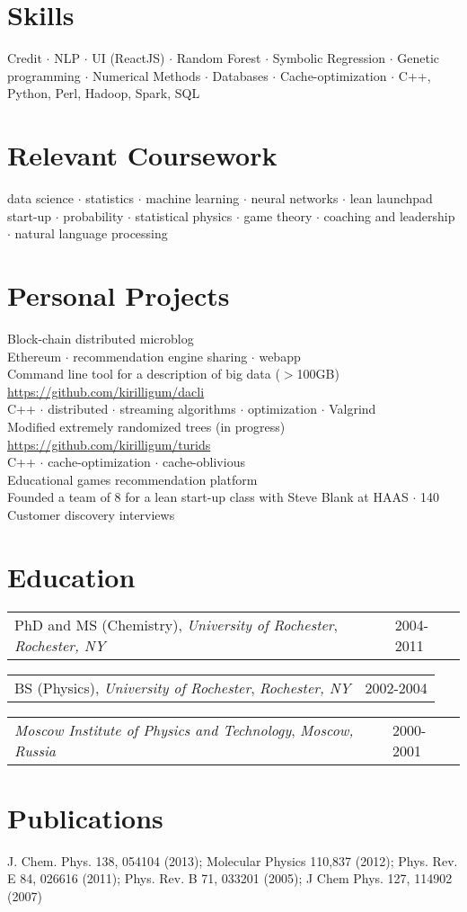 \documentclass{res}
\makeatletter
\newcommand{\af}[3]{
\begin{tabular*}{\textwidth}[t]{@{}p{5.2in} l} 
    #1, \textit{#2} & #3\\
  \end{tabular*}
}
\newcommand{\skills}[2]{
  #1\\
  {\color[RGB]{106,106,106} #2}\\
}
\makeatother
\begin{document}
\begin{resume}
\section{Skills}
	Credit $\cdot$
	NLP $\cdot$
	UI (ReactJS) $\cdot$
	Random Forest $\cdot$
	Symbolic Regression $\cdot$
	Genetic programming $\cdot$
	Numerical Methods $\cdot$
	Databases $\cdot$
	Cache-optimization $\cdot$
	C++, Python, Perl, Hadoop, Spark, SQL

\section{Relevant Coursework}
  data science $\cdot$
  statistics $\cdot$
  machine learning $\cdot$
  neural networks $\cdot$
  lean launchpad start-up $\cdot$
  probability $\cdot$
  statistical physics $\cdot$
  game theory $\cdot$
  coaching and leadership $\cdot$
  natural language processing
\\

\section{Personal Projects}
\skills{Block-chain distributed microblog}{
	Ethereum $\cdot$
	recommendation engine sharing $\cdot$
	webapp
}
\skills{Command line tool for a description of big data ($>$100GB) \url{https://github.com/kirilligum/dacli}}{
	C++ $\cdot$
	distributed $\cdot$
	streaming algorithms $\cdot$
	optimization $\cdot$
	Valgrind
}
\skills{Modified extremely randomized trees (in progress) \url{https://github.com/kirilligum/turids}}{
	C++ $\cdot$
	cache-optimization $\cdot$
	cache-oblivious
}
\skills{Educational games recommendation platform}{
  Founded a team of 8 for a lean start-up class with Steve Blank at HAAS $\cdot$ 
  140 Customer discovery interviews
}

\section{Education}          
\af{PhD and MS (Chemistry), \textit{University of Rochester}}{Rochester, NY}{2004-2011}
\af{BS (Physics), \textit{University of Rochester}}{Rochester, NY}{2002-2004}
\af{\textit{Moscow Institute of Physics and Technology}}{Moscow, Russia} {2000-2001}
\section{Publications}
  J. Chem. Phys.  138, 054104 (2013);
  Molecular Physics 110,837 (2012);
  Phys. Rev. E 84, 026616 (2011);
  Phys. Rev. B 71, 033201 (2005);
  J Chem Phys. 127, 114902 (2007)
\\


\end{resume}
\end{document}
